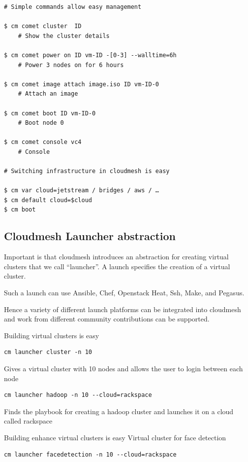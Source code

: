 \begin{Verbatim}
# Simple commands allow easy management

$ cm comet cluster  ID
    # Show the cluster details

$ cm comet power on ID vm-ID -[0-3] --walltime=6h
    # Power 3 nodes on for 6 hours

$ cm comet image attach image.iso ID vm-ID-0
    # Attach an image

$ cm comet boot ID vm-ID-0
    # Boot node 0

$ cm comet console vc4
    # Console 

# Switching infrastructure in cloudmesh is easy

$ cm var cloud=jetstream / bridges / aws / …
$ cm default cloud=$cloud
$ cm boot
\end{Verbatim}

\subsection{Cloudmesh Launcher abstraction}

Important is that cloudmesh introduces an abstraction for creating
virtual clusters that we call “launcher”. A launch specifies the
creation of a virtual cluster. 

Such a launch can use
Ansible,
Chef,
Openstack Heat,
Ssh,
Make, and
Pegasus.


Hence a variety of different launch platforms can be integrated into cloudmesh and work from different community contributions can be supported.

Building virtual clusters is easy

\begin{Verbatim}
cm launcher cluster -n 10
\end{Verbatim}

Gives a virtual cluster with 10 nodes and allows the user to login between each node

\begin{Verbatim}
cm launcher hadoop -n 10 --cloud=rackspace
\end{Verbatim}

Finds the playbook for creating a hadoop cluster and launches it on a cloud called rackspace

Building enhance virtual clusters is easy
Virtual cluster for face detection

\begin{Verbatim}
cm launcher facedetection -n 10 --cloud=rackspace
\end{Verbatim}

